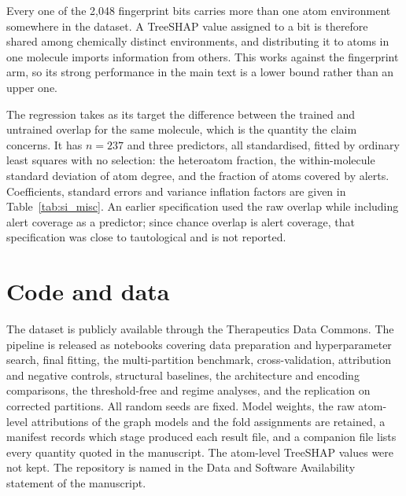 \documentclass[journal=jcisd8,manuscript=suppinfo]{achemso}
\begin{document}


Every one of the 2,048 fingerprint bits carries more than one atom environment somewhere in
the dataset. A TreeSHAP value assigned to a bit is therefore shared among chemically distinct
environments, and distributing it to atoms in one molecule imports information from others.
This works against the fingerprint arm, so its strong performance in the main text is a lower
bound rather than an upper one.

The regression takes as its target the difference between the trained and untrained overlap
for the same molecule, which is the quantity the claim concerns. It has $n = 237$ and three
predictors, all standardised, fitted by ordinary least squares with no selection: the
heteroatom fraction, the within-molecule standard deviation of atom degree, and the fraction
of atoms covered by alerts. Coefficients, standard errors and variance inflation factors are
given in Table~\ref{tab:si_misc}. An earlier specification
used the raw overlap while including alert coverage as a predictor; since chance overlap is
alert coverage, that specification was close to tautological and is not reported.

\section{Code and data}

The dataset is publicly available through the Therapeutics Data Commons. The pipeline is
released as notebooks covering data preparation and hyperparameter search, final
fitting, the multi-partition benchmark, cross-validation, attribution and negative controls,
structural baselines, the architecture and encoding comparisons, the threshold-free and
regime analyses, and the replication on corrected partitions. All random seeds
are fixed. Model weights, the raw atom-level attributions of the graph models and the fold
assignments are retained, a manifest records which stage produced each result file, and a
companion file lists every quantity quoted in the manuscript. The atom-level TreeSHAP values
were not kept.
The repository is named in the Data and Software Availability statement of the manuscript.


\end{document}
